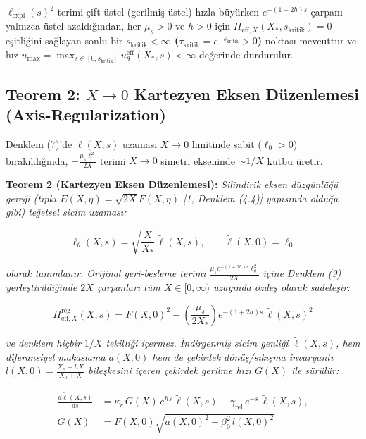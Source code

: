 \documentclass[12pt,a4paper]{article}
\begin{document}
$\ell_{\mathrm{expl}}(s)^2$ terimi çift-üstel (gerilmiş-üstel) hızla büyürken $e^{-(1+2h)s}$ çarpanı yalnızca üstel azaldığından, her $\mu_s > 0$ ve $h > 0$ için $\Pi_{\mathrm{eff}, X}(X_*, s_{\mathrm{kritik}}) = 0$ eşitliğini sağlayan sonlu bir \textbf{$s_{\mathrm{kritik}} < \infty$ ($\tau_{\mathrm{kritik}} = e^{-s_{\mathrm{kritik}}} > 0$)} noktası mevcuttur ve hız $u_{\max} = \max_{s \in [0, s_{\mathrm{kritik}}]} u_\theta^{\mathrm{eff}}(X_*, s) < \infty$ değerinde durdurulur.

\subsection{Teorem 2: $X \to 0$ Kartezyen Eksen Düzenlemesi (Axis-Regularization)}

Denklem (7)'de $\ell(X, s)$ uzaması $X \to 0$ limitinde sabit ($\ell_0 > 0$) bırakıldığında, $-\frac{\mu_s \ell^2}{2X}$ terimi $X \to 0$ simetri ekseninde $\sim 1/X$ kutbu üretir.

\textbf{Teorem 2 (Kartezyen Eksen Düzenlemesi):} \textit{Silindirik eksen düzgünlüğü gereği (tıpkı $E(X, \eta) = \sqrt{2X} F(X, \eta)$ [1, Denklem (4.4)] yapısında olduğu gibi) teğetsel sicim uzaması:}

\begin{equation}
\ell_\theta(X, s) = \sqrt{\frac{X}{X_*}} \, \tilde{\ell}(X, s), \qquad \tilde{\ell}(X, 0) = \ell_0
\end{equation}

\textit{olarak tanımlanır. Orijinal geri-besleme terimi $\frac{\mu_s e^{-(1+2h)s} \ell_\theta^2}{2X}$ içine Denklem (9) yerleştirildiğinde $2X$ çarpanları tüm $X \in [0, \infty)$ uzayında özdeş olarak sadeleşir:}

\begin{equation}
\Pi_{\mathrm{eff}, X}^{\mathrm{reg}}(X, s) = F(X, 0)^2 - \left( \frac{\mu_s}{2 X_*} \right) e^{-(1+2h)s} \, \tilde{\ell}(X, s)^2
\end{equation}

\textit{ve denklem hiçbir $1/X$ tekilliği içermez. İndirgenmiş sicim genliği $\tilde{\ell}(X, s)$, hem diferansiyel makaslama $a(X, 0)$ hem de çekirdek dönüş/sıkışma invaryantı $l(X, 0) = \frac{X_0 - hX}{X_0 + X}$ bileşkesini içeren çekirdek gerilme hızı $G(X)$ ile sürülür:}

\begin{equation}
\begin{split}
\frac{d \tilde{\ell}(X, s)}{ds} &= \kappa_r \, G(X) \, e^{h s} \, \tilde{\ell}(X, s) - \gamma_{\mathrm{rel}} \, e^{-s} \, \tilde{\ell}(X, s), \\
G(X) &= F(X, 0) \sqrt{a(X, 0)^2 + \beta_0^2 \, l(X, 0)^2}
\end{split}
\end{equation}
\end{document}
